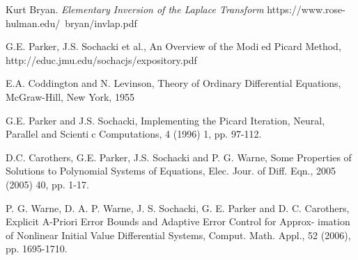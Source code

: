 \begin{thebibliography}{99}
 Kurt Bryan. {\it Elementary Inversion of the Laplace Transform} https://www.rose-hulman.edu/~bryan/invlap.pdf

 G.E. Parker, J.S. Sochacki et al., An Overview of the Modied Picard
Method, http://educ.jmu.edu/sochacjs/expository.pdf

 E.A. Coddington and N. Levinson, Theory of Ordinary Differential Equations, McGraw-Hill, New York, 1955

 G.E. Parker and J.S. Sochacki, Implementing the Picard Iteration, Neural, Parallel and Scientic Computations, 4 (1996) 1, pp. 97-112.

 D.C. Carothers, G.E. Parker, J.S. Sochacki and P. G. Warne, Some
Properties of Solutions to Polynomial Systems of Equations, Elec. Jour. of Diff. Eqn.,
2005 (2005) 40, pp. 1-17.

 P. G. Warne, D. A. P. Warne, J. S. Sochacki, G. E. Parker and D. C.
Carothers, Explicit A-Priori Error Bounds and Adaptive Error Control for Approx-
imation of Nonlinear Initial Value Differential Systems, Comput. Math. Appl., 52
(2006), pp. 1695-1710.


\end{thebibliography}